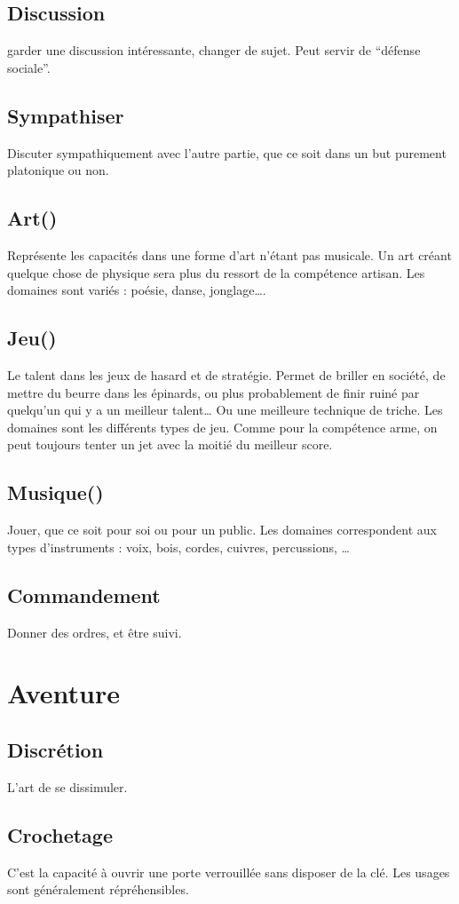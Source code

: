 \documentclass[10pt,a4paper,twocolumn]{book}
\begin{document}
\subsection*{Discussion}
garder une discussion intéressante, changer de sujet. Peut servir de “défense sociale”.
\subsection*{Sympathiser}
Discuter sympathiquement avec l’autre partie, que ce soit dans un but purement platonique ou non.
\subsection*{Art()}
Représente les capacités dans une forme d’art n’étant pas musicale. Un art créant quelque chose de physique sera plus du ressort de la compétence artisan. Les domaines sont variés : poésie, danse, jonglage….
\subsection*{Jeu()}
Le talent dans les jeux de hasard et de stratégie. Permet de briller en société, de mettre du beurre dans les épinards, ou plus probablement de finir ruiné par quelqu’un qui y a un meilleur talent… Ou une meilleure technique de triche. Les domaines sont les différents types de jeu. Comme pour la compétence arme, on peut toujours tenter un jet avec la moitié du meilleur score.
\subsection*{Musique()}
Jouer, que ce soit pour soi ou pour un public. Les domaines correspondent aux types d’instruments : voix, bois, cordes, cuivres, percussions, …
\subsection*{Commandement}
Donner des ordres, et être suivi.
\section{Aventure}
\subsection*{Discrétion}
L’art de se dissimuler.
\subsection*{Crochetage }
C’est la capacité à ouvrir une porte verrouillée sans disposer de la clé. Les usages sont généralement répréhensibles.
\end{document}
